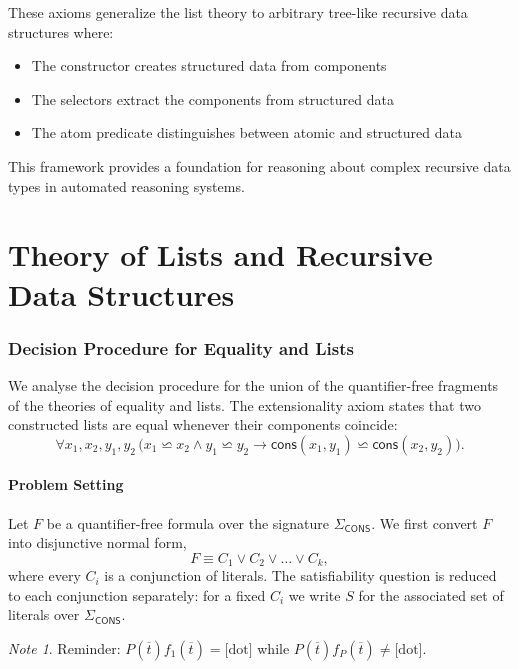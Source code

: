 \documentclass[11pt,a4paper]{article}
\theoremstyle{definition}
\theoremstyle{plain}
\theoremstyle{remark}
\newtheorem*{remark}{Note}
\begin{document}
These axioms generalize the list theory to arbitrary tree-like recursive data structures where:
\begin{itemize}
    \item The constructor creates structured data from components
    \item The selectors extract the components from structured data
    \item The atom predicate distinguishes between atomic and structured data
\end{itemize}

This framework provides a foundation for reasoning about complex recursive data types in automated reasoning systems.




\newpage

\part{Theory of Lists and Recursive Data Structures}

\section{Decision Procedure for Equality and Lists}

We analyse the decision procedure for the union of the quantifier-free fragments of the theories of equality and lists. The extensionality axiom states that two constructed lists are equal whenever their components coincide:
\[
\forall x_1, x_2, y_1, y_2 \,\bigl(x_1 \backsimeq x_2 \wedge y_1 \backsimeq y_2 \rightarrow \textsf{cons}(x_1, y_1) \backsimeq \textsf{cons}(x_2, y_2)\bigr).
\]

\subsection{Problem Setting}

Let $F$ be a quantifier-free formula over the signature $\Sigma_{\textsf{CONS}}$. We first convert $F$ into disjunctive normal form,
\[
F \equiv C_1 \vee C_2 \vee \dots \vee C_k,
\]
where every $C_i$ is a conjunction of literals. The satisfiability question is reduced to each conjunction separately: for a fixed $C_i$ we write $S$ for the associated set of literals over $\Sigma_{\textsf{CONS}}$.

\begin{remark}
Reminder: $P(\overline{t}) f_1(\overline{t}) = \text{[dot]}$ while $P(\overline{t}) f_P(\overline{t}) \neq \text{[dot]}$.
\end{remark}
\end{document}
